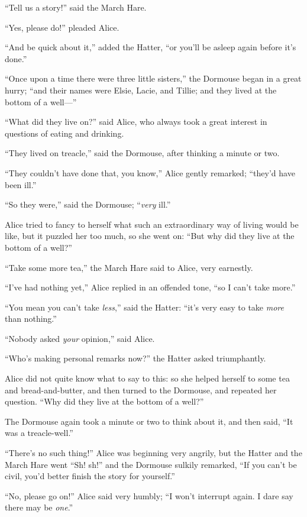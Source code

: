 \documentclass[11pt,openany,oneside]{book}
\begin{document}
“Tell us a story!” said the March Hare. 

“Yes, please do!” pleaded Alice. 

“And be quick about it,” added the Hatter, “or you’ll be asleep again before it’s done.” 

“Once upon a time there were three little sisters,” the Dormouse began in a great hurry; “and their names were Elsie, Lacie, and Tillie; and they lived at the bottom of a well—” 

“What did they live on?” said Alice, who always took a great interest in questions of eating and drinking. 

“They lived on treacle,” said the Dormouse, after thinking a minute or two. 

“They couldn’t have done that, you know,” Alice gently remarked; “they’d have been ill.” 

“So they were,” said the Dormouse; “{\em very\/} ill.” 

Alice tried to fancy to herself what such an extraordinary way of living would be like, but it puzzled her too much, so she went on: “But why did they live at the bottom of a well?” 

“Take some more tea,” the March Hare said to Alice, very earnestly. 

“I’ve had nothing yet,” Alice replied in an offended tone, “so I can’t take more.” 

“You mean you can’t take {\em less\/},” said the Hatter: “it’s very easy to take {\em more\/} than nothing.” 

“Nobody asked {\em your\/} opinion,” said Alice. 

“Who’s making personal remarks now?” the Hatter asked triumphantly. 

Alice did not quite know what to say to this: so she helped herself to some tea and bread-and-butter, and then turned to the Dormouse, and repeated her question. “Why did they live at the bottom of a well?” 

The Dormouse again took a minute or two to think about it, and then said, “It was a treacle-well.” 

“There’s no such thing!” Alice was beginning very angrily, but the Hatter and the March Hare went “Sh! sh!” and the Dormouse sulkily remarked, “If you can’t be civil, you’d better finish the story for yourself.” 

“No, please go on!” Alice said very humbly; “I won’t interrupt again. I dare say there may be {\em one\/}.” 
\end{document}

